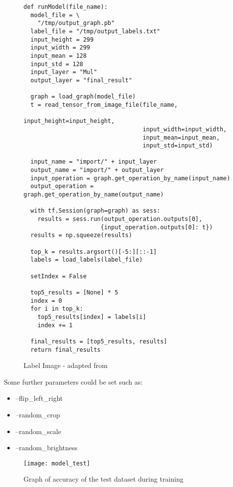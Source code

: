 \begin{figure}[h]
\caption{Label Image - adapted from \parencite{retrainInception}}
\label{lst:labelImage2}
\begin{lstlisting}[style=Python]
def runModel(file_name):
  model_file = \
    "/tmp/output_graph.pb"
  label_file = "/tmp/output_labels.txt"
  input_height = 299
  input_width = 299
  input_mean = 128
  input_std = 128
  input_layer = "Mul"
  output_layer = "final_result"

  graph = load_graph(model_file)
  t = read_tensor_from_image_file(file_name,
                                  input_height=input_height,
                                  input_width=input_width,
                                  input_mean=input_mean,
                                  input_std=input_std)

  input_name = "import/" + input_layer
  output_name = "import/" + output_layer
  input_operation = graph.get_operation_by_name(input_name)
  output_operation = graph.get_operation_by_name(output_name)

  with tf.Session(graph=graph) as sess:
    results = sess.run(output_operation.outputs[0],
                      {input_operation.outputs[0]: t})
  results = np.squeeze(results)

  top_k = results.argsort()[-5:][::-1]
  labels = load_labels(label_file)
  
  setIndex = False

  top5_results = [None] * 5
  index = 0
  for i in top_k:
    top5_results[index] = labels[i]
    index += 1

  final_results = [top5_results, results]
  return final_results
\end{lstlisting}
\end{figure}

Some further parameters could be set such as:
\begin{itemize}
	\item{--flip\_left\_right}
	\item{--random\_crop}
	\item{--random\_scale}
	\item{--random\_brightness}
\end{itemize}

\begin{figure}[h]
    \texttt{[image: model\_test]}
     \caption{Graph of accuracy of the test dataset during training}
     \label{fig:model_train_test}
\end{figure}

